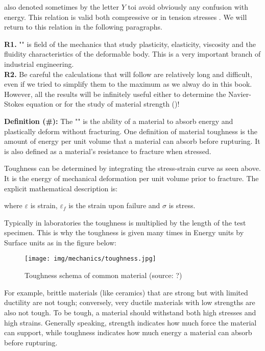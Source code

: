	also denoted sometimes by the letter $Y$ toi avoid obviously any confusion with energy.  This relation is valid both compressive or in tension stresses . We will return to this relation in the following paragraphs.
	\begin{tcolorbox}[title=Remark,colframe=black,arc=10pt]
	\textbf{R1.} "" is field of the mechanics that study plasticity, elasticity, viscosity and the fluidity characteristics of the deformable body. This is a very important branch of industrial engineering.\\
	
	\textbf{R2.} Be careful the calculations that will follow are relatively long and difficult, even if we tried to simplify them to the maximum as we alway do in this book. However, all the results will be infinitely useful either to determine the Navier-Stokes equation or for the study of material strength ()!
	\end{tcolorbox}
	
	\textbf{Definition (\#\mydef):}  The "" is the ability of a material to absorb energy and plastically deform without fracturing. One definition of material toughness is the amount of energy per unit volume that a material can absorb before rupturing. It is also defined as a material's resistance to fracture when stressed.
	
	Toughness can be determined by integrating the stress-strain curve as seen above. It is the energy of mechanical deformation per unit volume prior to fracture. The explicit mathematical description is:
	
	 
	where $\varepsilon$ is strain, $\varepsilon_f$ is the strain upon failure and $\sigma$ is stress.
	
	Typically in laboratories the toughness is multiplied by the length of the test specimen. This is why the toughness is given many times in Energy units by Surface units as in the figure below:
	\begin{figure}[H]
		\centering
		\texttt{[image: img/mechanics/toughness.jpg]}
		\caption{Toughness schema of common material (source: ?)}
	\end{figure}
	For example, brittle materials (like ceramics) that are strong but with limited ductility are not tough; conversely, very ductile materials with low strengths are also not tough. To be tough, a material should withstand both high stresses and high strains. Generally speaking, strength indicates how much force the material can support, while toughness indicates how much energy a material can absorb before rupturing.
	
